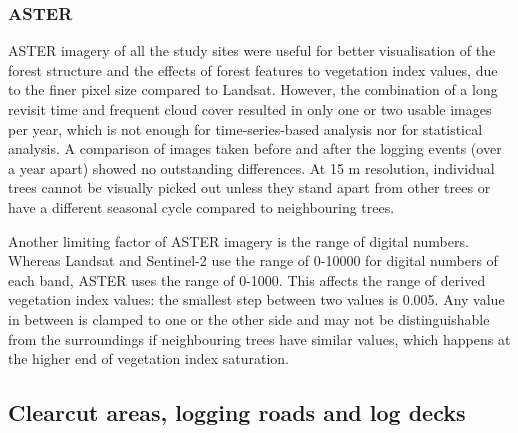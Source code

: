 \documentclass[a4paper,12pt]{scrbook}
\begin{document}
\subsubsection{ASTER}

\ac{ASTER} imagery of all the study sites were useful for better visualisation of the forest structure and the effects of forest features to vegetation index values, due to the finer pixel size compared to Landsat. However, the combination of a long revisit time and frequent cloud cover resulted in only one or two usable images per year, which is not enough for time-series-based analysis nor for statistical analysis. A comparison of images taken before and after the logging events (over a year apart) showed no outstanding differences. At 15 m resolution, individual trees cannot be visually picked out unless they stand apart from other trees or have a different seasonal cycle compared to neighbouring trees.

Another limiting factor of \ac{ASTER} imagery is the range of digital numbers. Whereas Landsat and Sentinel-2 use the range of 0-10000 for digital numbers of each band, \ac{ASTER} uses the range of 0-1000. This affects the range of derived vegetation index values: the smallest step between two values is 0.005. Any value in between is clamped to one or the other side and may not be distinguishable from the surroundings if neighbouring trees have similar values, which happens at the higher end of vegetation index saturation.

\subsection{Clearcut areas, logging roads and log decks}
\end{document}
